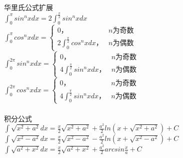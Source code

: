 \documentclass{article}
\begin{document}
\begin{flushleft}
	华里氏公式扩展\\
	$\int_{0}^{\pi}sin^nxdx=2\int_{0}^{\frac{\pi}{2}}sin^nxdx$\\
	$\int_{0}^{\pi}cos^nxdx=\left\{
	\begin{array}{lcl}
	0， & n\mbox{为奇数}\\
	2\int_{0}^{\frac{\pi}{2}}cos^nxdx， & n\mbox{为偶数}
	\end{array} \right.$\\
	$\int_{0}^{2\pi}sin^nxdx=\left\{
	\begin{array}{lcl}
	0， & n\mbox{为奇数}\\
	4\int_{0}^{\frac{\pi}{2}}sin^nxdx， & n\mbox{为偶数}
	\end{array} \right.$\\
	$\int_{0}^{2\pi}cos^nxdx=\left\{
	\begin{array}{lcl}
	0， & n\mbox{为奇数}\\
	4\int_{0}^{\frac{\pi}{2}}sin^nxdx， & n\mbox{为偶数}
	\end{array} \right.$\\
	~\\
	积分公式\\
	$\int \sqrt{x^2+a^2}dx=\frac{x}{2}\sqrt{x^2+a^2}+\frac{a^2}{2}ln(x+\sqrt{x^2+a^2})+C$\\
	$\int \sqrt{x^2-a^2}dx=\frac{x}{2}\sqrt{x^2-a^2}-\frac{a^2}{2}ln(x+\sqrt{x^2-a^2})+C$\\
	$\int \sqrt{a^2+x^2}dx=\frac{x}{2}\sqrt{a^2+x^2}+\frac{a^2}{2}arcsin\frac{x}{a}+C$\\
	
\end{flushleft}
\end{document}
